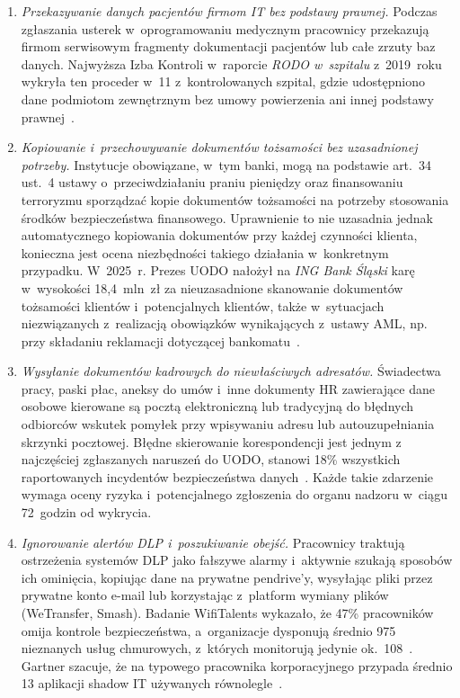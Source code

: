 \begin{enumerate}[label=(\roman*)]
\item \textit{Przekazywanie danych pacjentów firmom IT bez podstawy prawnej.}
Podczas zgłaszania usterek w~oprogramowaniu medycznym pracownicy przekazują
firmom serwisowym fragmenty dokumentacji pacjentów lub całe zrzuty baz danych.
Najwyższa Izba Kontroli w~raporcie \textit{RODO w~szpitalu} z~2019~roku wykryła
ten proceder w~11 z~kontrolowanych szpital, gdzie udostępniono dane podmiotom zewnętrznym
bez umowy powierzenia ani innej podstawy prawnej~\autocite{nik_rodo_szpital}.

\item \textit{Kopiowanie i~przechowywanie dokumentów tożsamości bez uzasadnionej potrzeby.}
Instytucje obowiązane, w~tym banki, mogą na podstawie
art.~34 ust.~4 ustawy o~przeciwdziałaniu praniu pieniędzy
oraz finansowaniu terroryzmu sporządzać kopie dokumentów
tożsamości na potrzeby stosowania środków bezpieczeństwa
finansowego. Uprawnienie to nie uzasadnia jednak automatycznego
kopiowania dokumentów przy każdej czynności klienta, konieczna jest ocena niezbędności takiego działania
w~konkretnym przypadku.
W~2025~r. Prezes UODO nałożył na \textit{ING Bank Śląski}
karę w~wysokości 18,4~mln~zł za nieuzasadnione skanowanie
dokumentów tożsamości klientów i~potencjalnych klientów,
także w~sytuacjach niezwiązanych z~realizacją obowiązków
wynikających z~ustawy AML, np. przy składaniu reklamacji
dotyczącej bankomatu~\autocite{gazeta_prawna_kary_2025}.

\item \textit{Wysyłanie dokumentów kadrowych do niewłaściwych adresatów.}
Świadectwa pracy, paski płac, aneksy do umów i~inne dokumenty HR zawierające dane
osobowe kierowane są pocztą elektroniczną lub tradycyjną do błędnych odbiorców wskutek
pomyłek przy wpisywaniu adresu lub autouzupełniania skrzynki pocztowej.
Błędne skierowanie korespondencji jest jednym z najczęściej zgłaszanych
naruszeń do UODO, stanowi 18\% wszystkich raportowanych incydentów
bezpieczeństwa danych~\autocite{dataprotectionpeople_human_error, odo24_naruszenia}.
Każde takie zdarzenie wymaga oceny ryzyka i~potencjalnego zgłoszenia do organu nadzoru
w~ciągu 72~godzin od wykrycia.

\item \textit{Ignorowanie alertów DLP i~poszukiwanie obejść.}
Pracownicy traktują ostrzeżenia systemów DLP jako fałszywe alarmy i~aktywnie
szukają sposobów ich ominięcia, kopiując dane na prywatne pendrive'y,
wysyłając pliki przez prywatne konto e-mail lub korzystając z~platform
wymiany plików (WeTransfer, Smash). Badanie WifiTalents wykazało,
że 47\% pracowników omija kontrole bezpieczeństwa,
a~organizacje dysponują średnio 975 nieznanych usług chmurowych,
z~których monitorują jedynie ok.\ 108~\autocite{wifitalents_shadow_2025, fidelis_shadow_2026}.
Gartner szacuje, że na typowego pracownika korporacyjnego przypada średnio
13 aplikacji shadow IT używanych równolegle~\autocite{wifitalents_shadow_2025}.

\end{enumerate}








